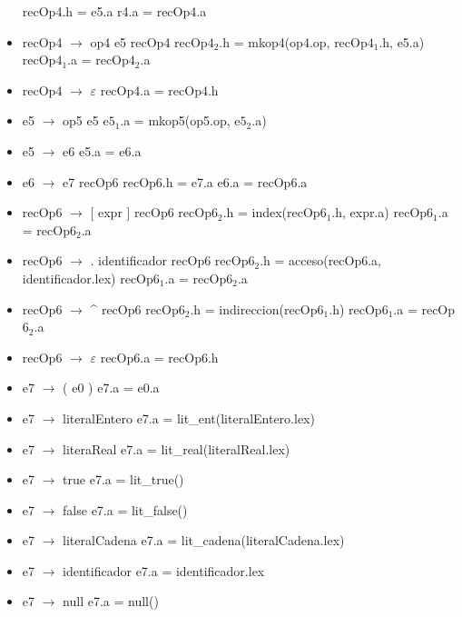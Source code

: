 \documentclass[11pt]{article}
\begin{document}
\begin{itemize}
                \subitem recOp4.h = e5.a
                \subitem r4.a = recOp4.a
            \item recOp4 $\rightarrow$ op4 e5 recOp4
                \subitem recOp$4_2$.h = mkop4(op4.op, recOp$4_1$.h, e5.a)
                \subitem recOp$4_1$.a = recOp$4_2$.a
            \item recOp4 $\rightarrow$ $\varepsilon$
                \subitem recOp4.a = recOp4.h
            \item e5 $\rightarrow$ op5 e5
                \subitem e$5_1$.a = mkop5(op5.op, e$5_2$.a)
            \item e5 $\rightarrow$ e6
                \subitem e5.a = e6.a
            \item e6 $\rightarrow$ e7 recOp6
                \subitem recOp6.h = e7.a
                \subitem e6.a = recOp6.a
            \item recOp6 $\rightarrow$ [ expr ] recOp6
                \subitem recOp$6_2$.h = index(recOp$6_1$.h, expr.a)
                \subitem recOp$6_1$.a = recOp$6_2$.a
            \item recOp6 $\rightarrow$ . identificador recOp6
                \subitem recOp$6_2$.h = acceso(recOp6.a, identificador.lex)
                \subitem recOp$6_1$.a = recOp$6_2$.a
            \item recOp6 $\rightarrow$ \^{} recOp6
                \subitem recOp$6_2$.h = indireccion(recOp$6_1$.h)
                \subitem recOp$6_1$.a = recOp$6_2$.a
            \item recOp6 $\rightarrow$ $\varepsilon$
                \subitem recOp6.a = recOp6.h
            \item e7 $\rightarrow$ ( e0 )
                \subitem e7.a = e0.a
            \item e7 $\rightarrow$ literalEntero
                \subitem e7.a = lit\_ent(literalEntero.lex)
            \item e7 $\rightarrow$ literaReal
                \subitem e7.a = lit\_real(literalReal.lex)
            \item e7 $\rightarrow$ true
                \subitem e7.a = lit\_true()
            \item e7 $\rightarrow$ false
                \subitem e7.a = lit\_false()
            \item e7 $\rightarrow$ literalCadena
                \subitem e7.a = lit\_cadena(literalCadena.lex)
            \item e7 $\rightarrow$ identificador
                \subitem e7.a = identificador.lex
            \item e7 $\rightarrow$ null
                \subitem e7.a = null()
        \end{itemize}
\end{document}
